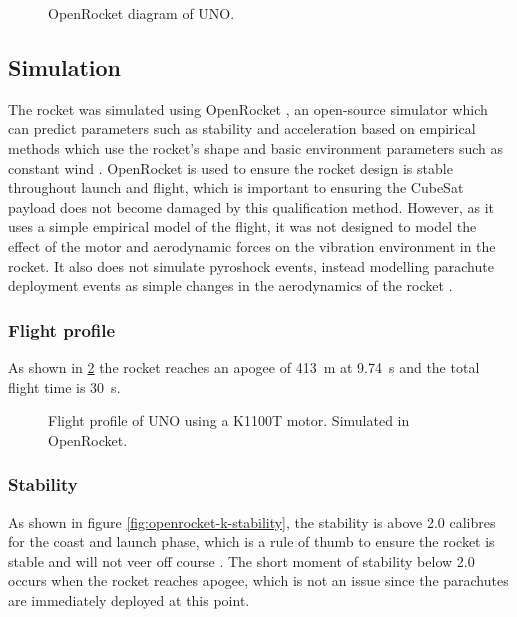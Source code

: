 \documentclass[a4paper,11pt]{article}
\begin{document}
\begin{figure}[H]
  
  \label{fig:openrocket}
  \caption{OpenRocket diagram of UNO.}
\end{figure}

\subsection{Simulation}

The rocket was simulated using OpenRocket \cite{openrocket,niskanen2009}, an open-source simulator which can predict parameters such as stability and acceleration based on empirical methods which use the rocket's shape and basic environment parameters such as constant wind \cite{doi:10.1177/0954410017752730,niskanen2009}. OpenRocket is used to ensure the rocket design is stable throughout launch and flight, which is important to ensuring the CubeSat payload does not become damaged by this qualification method. However, as it uses a simple empirical model of the flight, it was not designed to model the effect of the motor and aerodynamic forces on the vibration environment in the rocket. It also does not simulate pyroshock events, instead modelling parachute deployment events as simple changes in the aerodynamics of the rocket \cite{niskanen2009}.

\subsubsection{Flight profile}

As shown in \ref{fig:openrocket-k-launch} the rocket reaches an apogee of \SI{413}{\metre} at \SI{9.74}{\second} and the total flight time is \SI{30}{\second}.

\begin{figure}[H]
  
  \label{fig:openrocket-k-launch}
  \caption{Flight profile of UNO using a K1100T motor. Simulated in OpenRocket.}
\end{figure}


\subsubsection{Stability}

As shown in figure \ref{fig:openrocket-k-stability}, the stability is above 2.0 calibres for the coast and launch phase, which is a rule of thumb to ensure the rocket is stable and will not veer off course \cite{canepa2005modern}. The short moment of stability below 2.0 occurs when the rocket reaches apogee, which is not an issue since the parachutes are immediately deployed at this point.
\end{document}
